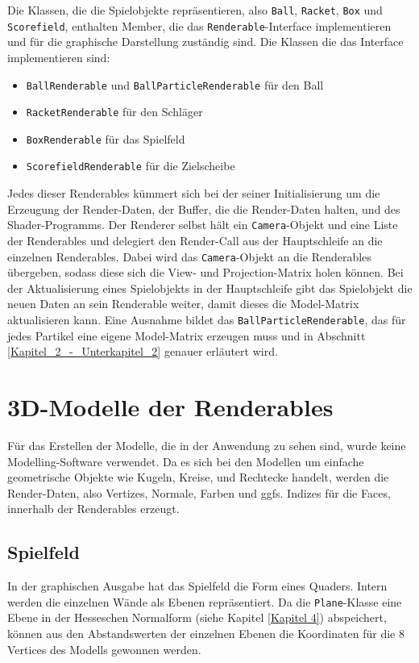 Die Klassen, die die Spielobjekte repräsentieren, also {\texttt{Ball}}, {\texttt{Racket}}, {\texttt{Box}} und {\texttt{Scorefield}}, enthalten Member, die das {\texttt{Renderable}}-Interface implementieren und für die graphische Darstellung zuständig sind. Die Klassen die das Interface implementieren sind:

\begin{itemize}
	\setlength\itemsep{0.05em}
	\item {\texttt{BallRenderable}} und {\texttt{BallParticleRenderable}} für den Ball
	\item {\texttt{RacketRenderable}} für den Schläger
	\item {\texttt{BoxRenderable}} für das Spielfeld
	\item {\texttt{ScorefieldRenderable}} für die Zielscheibe 	
\end{itemize}

Jedes dieser Renderables kümmert sich bei der seiner Initialisierung um die Erzeugung der Render-Daten, der Buffer, die die Render-Daten halten, und des Shader-Programms. Der Renderer selbst hält ein {\texttt{Camera}}-Objekt und eine Liste der Renderables und delegiert den Render-Call aus der Hauptschleife an die einzelnen Renderables. Dabei wird das {\texttt{Camera}}-Objekt an die Renderables übergeben, sodass diese sich die View- und Projection-Matrix holen können. Bei der Aktualisierung eines Spielobjekts in der Hauptschleife gibt das Spielobjekt die neuen Daten an sein Renderable weiter, damit dieses die Model-Matrix aktualisieren kann. Eine Ausnahme bildet das {\texttt{BallParticleRenderable}}, das für jedes Partikel eine eigene Model-Matrix erzeugen muss und in Abschnitt \ref{Kapitel_2_-_Unterkapitel_2} genauer erläutert wird.

\section{3D-Modelle der Renderables}
%
Für das Erstellen der Modelle, die in der Anwendung zu sehen sind, wurde keine Modelling-Software verwendet. Da es sich bei den Modellen um einfache geometrische Objekte wie Kugeln, Kreise, und Rechtecke handelt, werden die Render-Daten, also Vertizes, Normale, Farben und ggfs. Indizes für die Faces, innerhalb der Renderables erzeugt.

\subsection{Spielfeld}
%
In der graphischen Ausgabe hat das Spielfeld die Form eines Quaders. Intern werden die einzelnen Wände als Ebenen repräsentiert. Da die {\texttt{Plane}}-Klasse eine Ebene in der Hesseschen Normalform (siehe Kapitel \ref{Kapitel 4}) abspeichert, können aus den Abstandswerten der einzelnen Ebenen die Koordinaten für die 8 Vertices des Modells gewonnen werden.

